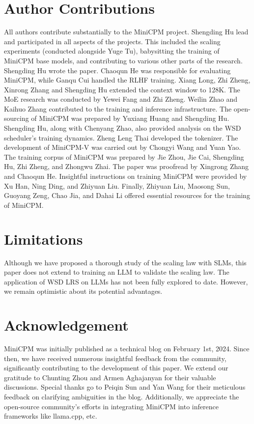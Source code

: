 \documentclass[dvipsnames]{article}
\begin{document}
\section*{Author Contributions}
All authors contribute substantially to the MiniCPM project. Shengding Hu lead and participated in all aspects of the projects. This included the scaling experiments (conducted alongside Yuge Tu), babysitting the training of MiniCPM base models, and contributing to various other parts of the research.  Shengding Hu wrote the paper. Chaoqun He was responsible for evaluating MiniCPM, while Ganqu Cui handled the RLHF training. Xiang Long, Zhi Zheng, Xinrong Zhang and Shengding Hu extended the context window to 128K. The MoE research was conducted by  Yewei Fang and Zhi Zheng. Weilin Zhao and Kaihuo Zhang contributed to the training and inference infrastructure. The open-sourcing of MiniCPM was prepared by Yuxiang Huang and Shengding Hu. Shengding Hu, along with Chenyang Zhao, also provided analysis on the WSD scheduler's training dynamics. Zheng Leng Thai developed the tokenizer. The development of MiniCPM-V was carried out by Chongyi Wang and Yuan Yao.
The training corpus of MiniCPM was prepared by Jie Zhou, Jie Cai, Shengding Hu, Zhi Zheng, and Zhongwu Zhai. The paper was proofread by Xingrong Zhang and Chaoqun He.
Insightful instructions on training MiniCPM were provided by Xu Han, Ning Ding, and Zhiyuan Liu. Finally, Zhiyuan Liu, Maosong Sun, Guoyang Zeng, Chao Jia, and Dahai Li offered essential resources for the training of MiniCPM.

\section*{Limitations}
Although we have proposed a thorough study of the scaling law with SLMs, this paper does not extend to training an LLM to validate the scaling law. The application of WSD LRS on LLMs has not been fully explored to date. However, we remain optimistic about its potential advantages.

\section*{Acknowledgement}
MiniCPM was initially published as a technical blog on February 1st, 2024. Since then, we have received numerous insightful feedback from the community, significantly contributing to the development of this paper. We extend our gratitude to Chunting Zhou and Armen Aghajanyan for their valuable discussions. Special thanks go to Peiqin Sun and Yan Wang for their meticulous feedback on clarifying ambiguities in the blog. Additionally, we appreciate the open-source community's efforts in integrating MiniCPM into inference frameworks like llama.cpp, etc. 
\end{document}
